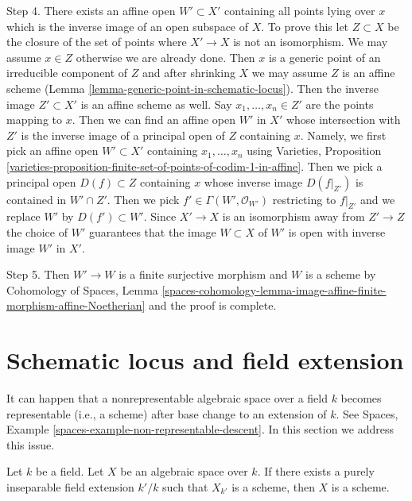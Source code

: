 \begin{remark}
\medskip\noindent
Step 4. There exists an affine open $W' \subset X'$ containing all points
lying over $x$ which is the inverse image of an open subspace of $X$.
To prove this let $Z \subset X$ be the closure of the set of points
where $X' \to X$ is not an isomorphism. We may assume $x \in Z$ otherwise
we are already done. Then $x$ is a generic point of an irreducible
component of $Z$ and after shrinking $X$ we may assume $Z$ is an affine scheme
(Lemma \ref{lemma-generic-point-in-schematic-locus}).
Then the inverse image $Z' \subset X'$ is an affine scheme as well.
Say $x_1, \ldots, x_n \in Z'$ are the points mapping to $x$.
Then we can find an affine open $W'$ in $X'$ whose intersection with
$Z'$ is the inverse image of a principal open of $Z$ containing $x$.
Namely, we first pick an affine open $W' \subset X'$ containing
$x_1, \ldots, x_n$ using Varieties, Proposition
\ref{varieties-proposition-finite-set-of-points-of-codim-1-in-affine}.
Then we pick a principal open $D(f) \subset Z$ containing $x$
whose inverse image $D(f|_{Z'})$ is contained in $W' \cap Z'$.
Then we pick $f' \in \Gamma(W', \mathcal{O}_{W'})$ restricting
to $f|_{Z'}$ and we replace $W'$ by $D(f') \subset W'$.
Since $X' \to X$ is an isomorphism away from $Z' \to Z$ the choice
of $W'$ guarantees that the image $W \subset X$ of $W'$ is open
with inverse image $W'$ in $X'$.

\medskip\noindent
Step 5. Then $W' \to W$ is a finite surjective morphism and $W$ is a scheme by
Cohomology of Spaces, Lemma
\ref{spaces-cohomology-lemma-image-affine-finite-morphism-affine-Noetherian}
and the proof is complete.
\end{remark}





\section{Schematic locus and field extension}
\label{section-schematic-and-field-extension}

\noindent
It can happen that a nonrepresentable algebraic space over a field $k$
becomes representable (i.e., a scheme) after base change to an extension
of $k$. See Spaces, Example \ref{spaces-example-non-representable-descent}.
In this section we address this issue.

\begin{lemma}
\label{lemma-scheme-after-purely-inseparable-base-change}
Let $k$ be a field. Let $X$ be an algebraic space over $k$.
If there exists a purely inseparable field extension $k'/k$
such that $X_{k'}$ is a scheme, then $X$ is a scheme.
\end{lemma}

